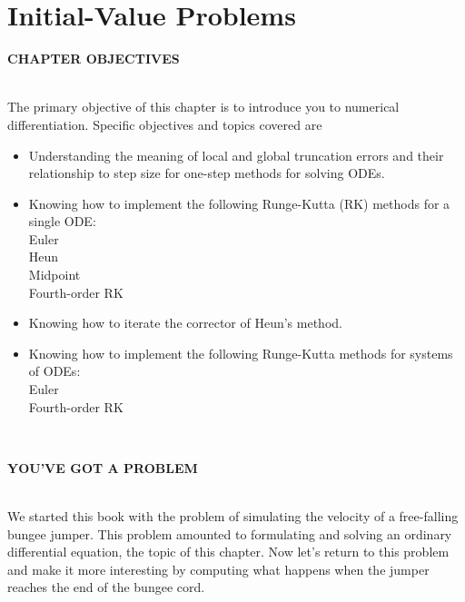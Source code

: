 


\part*{Initial-Value Problems}

\vspace{1,5in}

\begin{center}\begin{Large}\textbf{CHAPTER OBJECTIVES}\end{Large}\end{center}\\
The primary objective of this chapter is to introduce you to numerical differentiation.
Specific objectives and topics covered are

\begin{itemize}
	\item Understanding the meaning of local and global truncation errors and their
relationship to step size for one-step methods for solving ODEs.
	\item Knowing how to implement the following Runge-Kutta (RK) methods for 
a single ODE:\\
Euler\\
Heun\\
Midpoint\\
Fourth-order RK
	\item Knowing how to iterate the corrector of Heun’s method.
	\item Knowing how to implement the following Runge-Kutta methods for systems of ODEs:\\
Euler\\
Fourth-order RK\\
\end{itemize}\\
\vspace{0.3in}
\begin{Large}\textbf{YOU’VE GOT A PROBLEM}\end{Large}\\
We started this book with the problem of simulating the velocity of a free-falling
bungee jumper. This problem amounted to formulating and solving an ordinary
differential equation, the topic of this chapter. Now let’s return to this problem
and make it more interesting by computing what happens when the jumper reaches the end
of the bungee cord.

